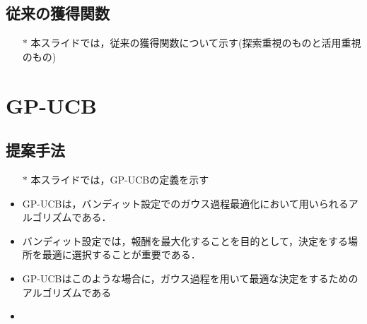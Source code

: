 \documentclass[dvipdfmx, 10.5pt]{beamer}
\begin{document}
\subsection{従来の獲得関数}
\begin{frame}{\insertsubsection}

	\begin{itemize}
		\item[$\ast$] 本スライドでは，従来の獲得関数について示す(探索重視のものと活用重視のもの)
	\end{itemize}
\end{frame}

\section{GP-UCB}

\subsection{提案手法}

\begin{frame}{\insertsubsection}
	\begin{itemize}
		\item[$\ast$] 本スライドでは，GP-UCBの定義を示す
		\item GP-UCBは，バンディット設定でのガウス過程最適化において用いられるアルゴリズムである．
		\item バンディット設定では，報酬を最大化することを目的として，決定をする場所を最適に選択することが重要である．
		\item GP-UCBはこのような場合に，ガウス過程を用いて最適な決定をするためのアルゴリズムである
		\item 
	\end{itemize}

\end{frame}
\end{document}
